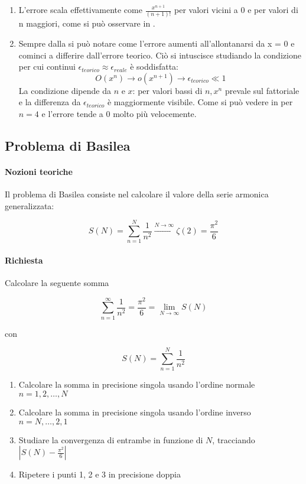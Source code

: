 \begin{enumerate}
	\item L'errore scala effettivamente come $\frac{x^{n+1}}{(n+1)!}$ per valori
	      vicini a 0 e per valori di n maggiori, come si può osservare in .

	\item Sempre dalla  si può notare come l'errore aumenti all'allontanarsi
	      da x = 0 e cominci a differire dall'errore teorico.
	      Ciò si intuscisce studiando la condizione per cui continui $\epsilon_{teorico} \approx \epsilon_{reale}$ è
	      soddisfatta: 
          $$O(x^n) \rightarrow o(x^{n+1}) \rightarrow \epsilon_{teorico} \ll 1$$ 
          La condizione dipende
	      da $n$ e $x$: per valori bassi di $n, x^n$ prevale sul fattoriale e la differenza
	      da $\epsilon_{teorico}$ è maggiormente visibile. Come si può vedere in 
	      per $n = 4$ e l'errore tende a 0 molto più velocemente.

\end{enumerate}


\subsection{Problema di Basilea}

\paragraph{Nozioni teoriche}

Il problema di Basilea consiste nel calcolare il valore della serie armonica generalizzata:

$$
	S(N) = \sum_{n=1}^{N} \frac{1}{n^2} \xrightarrow{N \to \infty} \zeta(2) = \frac{\pi^2}{6}
$$

\paragraph{Richiesta} 

Calcolare la seguente somma

\[
\sum_{n=1}^{\infty} \frac{1}{n^2} = \frac{\pi^2}{6} = \lim_{N \to \infty} S(N)
\]

con

\[
S(N) = \sum_{n=1}^{N} \frac{1}{n^2}
\]

\begin{enumerate}
    \item Calcolare la somma in precisione singola usando l'ordine normale \( n = 1, 2, \dots, N \)
    \item Calcolare la somma in precisione singola usando l'ordine inverso \( n = N, \dots, 2, 1 \)
    \item Studiare la convergenza di entrambe in funzione di \( N \), tracciando \( \left| S(N) - \frac{\pi^2}{6} \right| \)
    \item Ripetere i punti 1, 2 e 3 in precisione doppia
\end{enumerate}



